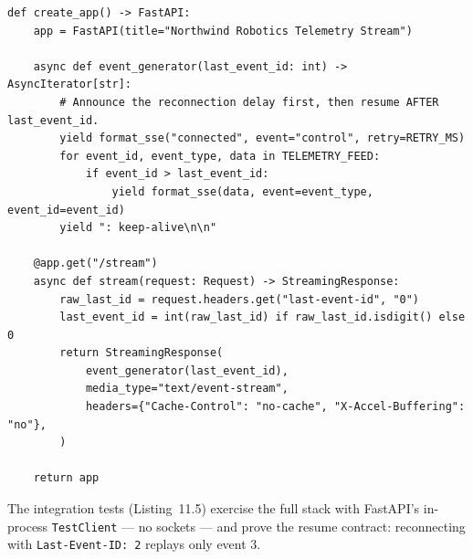 \begin{verbatim}
def create_app() -> FastAPI:
    app = FastAPI(title="Northwind Robotics Telemetry Stream")

    async def event_generator(last_event_id: int) -> AsyncIterator[str]:
        # Announce the reconnection delay first, then resume AFTER last_event_id.
        yield format_sse("connected", event="control", retry=RETRY_MS)
        for event_id, event_type, data in TELEMETRY_FEED:
            if event_id > last_event_id:
                yield format_sse(data, event=event_type, event_id=event_id)
        yield ": keep-alive\n\n"

    @app.get("/stream")
    async def stream(request: Request) -> StreamingResponse:
        raw_last_id = request.headers.get("last-event-id", "0")
        last_event_id = int(raw_last_id) if raw_last_id.isdigit() else 0
        return StreamingResponse(
            event_generator(last_event_id),
            media_type="text/event-stream",
            headers={"Cache-Control": "no-cache", "X-Accel-Buffering": "no"},
        )

    return app
\end{verbatim}

The integration tests (Listing~11.5) exercise the full stack with FastAPI's
in-process \texttt{TestClient} --- no sockets --- and prove the resume
contract: reconnecting with \texttt{Last-Event-ID: 2} replays only event 3.

